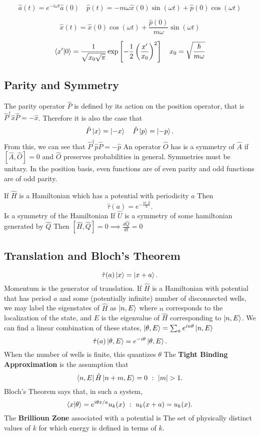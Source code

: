 \documentclass{article}
\begin{document}
      \[
        \hat{a}(t) = e^{-i \omega t}\hat{a}(0) \quad 
        \hat{p}(t) = - m \omega \hat{x}(0) \sin(\omega t) + \hat{p}(0) \cos(\omega t) 
      \]
    
      \[
        \hat{x}(t) = \hat{x}(0) \cos(\omega t) + \frac{\hat{p}(0)}{m \omega }\sin(\omega t)
      \]

			\[
				\braket{x'}{0} = \frac{1}{\sqrt{x_0 \sqrt{\pi}}} \exp\left[ -\frac{1}{2}
				\left(\frac{x'}{x_0}\right)^2\right]
				\quad
				x_0 = \sqrt{\frac{\hbar}{m\omega}}
			\]
    \subsection*{Parity and Symmetry}    
      The parity operator $\hat{P}$ is defined by its action on the position 
      operator, that is  $\hat{P}^\dagger \hat{x} \hat{P} = - \hat{x}$. Therefore
      it is also the case that \[
        \hat{P}\ket{x} = \ket{-x}  \quad \hat{P}\ket{p} = \ket{-p}
      .\] 
      From this, we can see that $\hat{P}^{\dagger}\hat{p}\hat{P} = -\hat{p}$ 
      An operator $\hat{O}$ has is a symmetry of $\hat{A}$ if 
      $[\hat{A},\hat{O}]=0$ and $\hat{O}$ preserves probabilities in general.
      Symmetries must be unitary.
      In the position basis, even functions are of even parity and odd 
      functions are of odd parity.
      
      If $\hat{H}$ is a Hamiltonian which has a potential with periodicity  $a$
      Then 
      \[
        \hat{\tau}(a) = e^{-\frac{i a \cdot \hat{p} }{\hbar}}
      .\]  
      Is a symmetry of the Hamiltonian 
      If $\hat{U}$ is a symmetry of some hamiltonian generated by  $\hat{Q}$
      Then  $[\hat{H},\hat{Q}] = 0 \implies \frac{d\hat{Q}}{dt} = 0$

    \subsection*{Translation and Bloch's Theorem}
      \[
        \hat{\tau}(a) \ket{x} = \ket{x + a}
      .\]  
      Momentum is the generator of translation. 
      If $\hat{H}$ is a Hamiltonian with potential that has period $a$
      and some (potentially infinite) number of disconnected wells, we may 
      label the eigenstates of  $\hat H$ as  $ \ket{n,E}$ where  $n$ 
      corresponds to the localization of the state, and  $E$ is the eigenvalue
      of  $\hat H $ corresponding to  $\ket{n,E}$. We can find a linear 
      combination of these states, $\ket{\theta,E} = \sum_n e^{i n \theta}\ket{n,E}$
      \[
        \hat{\tau}(a) \ket{\theta,E} = e^{-i\theta}\ket{\theta,E}
      .\] 
      When the number of wells is finite, this quantizes $\theta$
      The \textbf{Tight Binding Approximation} is the assumption that 
      \[
        \bra{n,E}\hat{H}\ket{n+m,E}=0 \,\,:\,\, |m| > 1
      .\] 
     Bloch's Theorem says that, in such a system, \[
       \bra{x}\ket{\theta}= e^{i \theta x /a}u_k(x) \,\,:\,\, u_k(x + a) = u_k(x)
     .\]  
     The \textbf{Brillioun Zone} associated with a potential is 
     The set of physically distinct values of $k$ for which energy is defined 
     in terms of  $k$.
\end{document}
